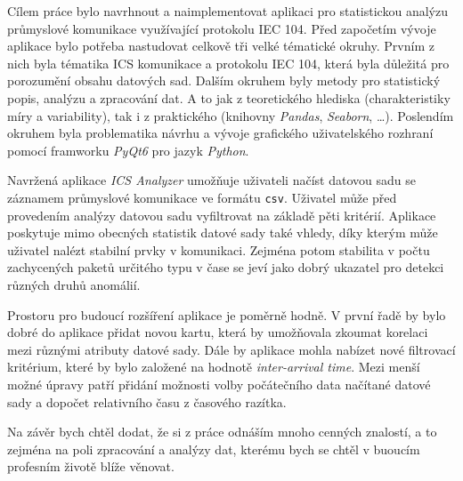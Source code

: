 Cílem práce bylo navrhnout a naimplementovat aplikaci pro statistickou analýzu průmyslové komunikace využívající protokolu IEC 104. Před započetím vývoje aplikace bylo potřeba nastudovat celkově tři velké tématické okruhy. Prvním z nich byla tématika ICS komunikace a protokolu IEC 104, která byla důležitá pro porozumění obsahu datových sad. Dalším okruhem byly metody pro statistický popis, analýzu a zpracování dat. A to jak z teoretického hlediska (charakteristiky míry a variability), tak i z praktického (knihovny \emph{Pandas}, \emph{Seaborn}, \dots). Poslendím okruhem byla problematika návrhu a vývoje grafického uživatelského rozhraní pomocí framworku \emph{PyQt6} pro jazyk \emph{Python}.

Navržená aplikace \emph{ICS Analyzer} umožňuje uživateli načíst datovou sadu se záznamem průmyslové komunikace ve formátu \texttt{csv}. Uživatel může před provedením analýzy datovou sadu vyfiltrovat na základě pěti kritérií. Aplikace poskytuje mimo obecných statistik datové sady také vhledy, díky kterým může uživatel nalézt stabilní prvky v komunikaci. Zejména potom stabilita v počtu zachycených paketů určitého typu v čase se jeví jako dobrý ukazatel pro detekci různých druhů anomálií.

Prostoru pro budoucí rozšíření aplikace je poměrně hodně. V první řadě by bylo dobré do aplikace přidat novou kartu, která by umožňovala zkoumat korelaci mezi různými atributy datové sady. Dále by aplikace mohla nabízet nové filtrovací kritérium, které by bylo založené na hodnotě \emph{inter-arrival time}. Mezi menší možné úpravy patří přidání možnosti volby počátečního data načítané datové sady a dopočet relativního času z časového razítka.

Na závěr bych chtěl dodat, že si z práce odnáším mnoho cenných znalostí, a to zejména na poli zpracování a analýzy dat, kterému bych se chtěl v buoucím profesním životě blíže věnovat. 




